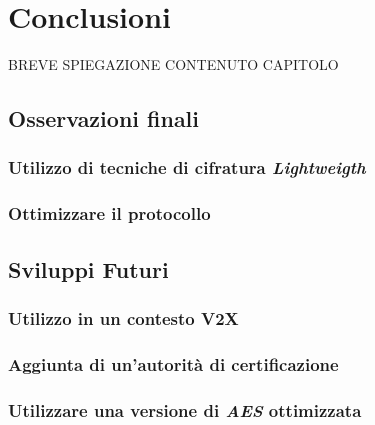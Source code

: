 \chapter{Conclusioni} %
%

\begin{citazione}
	BREVE SPIEGAZIONE CONTENUTO CAPITOLO
\end{citazione}

\section{Osservazioni finali}

\subsection{Utilizzo di tecniche di cifratura \emph{Lightweigth}}

\subsection{Ottimizzare il protocollo}

\section{Sviluppi Futuri}

\subsection{Utilizzo in un contesto V2X}

\subsection{Aggiunta di un'autorità di certificazione}

\subsection{Utilizzare una versione di \emph{AES} ottimizzata}

\newpage
